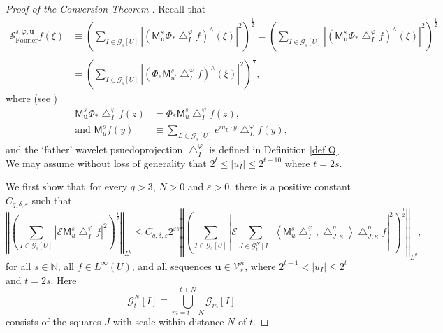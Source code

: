 \documentclass{amsart}%
\theoremstyle{plain}
\numberwithin{equation}{section}
\begin{document}
\begin{proof}
[Proof of the Conversion Theorem ]Recall that%
\begin{align*}
\mathcal{S}_{\operatorname*{Fourier}}^{s,\varphi,\mathbf{u}}f\left(
\xi\right)   & \equiv\left(  \sum_{I\in\mathcal{G}_{s}\left[  U\right]
}\left\vert \left(  \mathsf{M}_{\mathbf{u}}^{s}\Phi_{\ast}\bigtriangleup
_{I}^{\varphi}f\right)  ^{\wedge}\left(  \xi\right)  \right\vert ^{2}\right)
^{\frac{1}{2}}=\left(  \sum_{I\in\mathcal{G}_{s}\left[  U\right]  }\left\vert
\left(  \mathsf{M}_{\mathbf{u}}^{s}\Phi_{\ast}\bigtriangleup_{I}^{\varphi
}f\right)  ^{\wedge}\left(  \xi\right)  \right\vert ^{2}\right)  ^{\frac{1}%
{2}}\\
& =\left(  \sum_{I\in\mathcal{G}_{s}\left[  U\right]  }\left\vert \left(
\Phi_{\ast}\mathsf{M}_{u^{\prime}}^{s}\bigtriangleup_{I}^{\varphi}f\right)
^{\wedge}\left(  \xi\right)  \right\vert ^{2}\right)  ^{\frac{1}{2}},
\end{align*}
where (see \cite[(4.6)]{RiSa2})%
\begin{align}
\mathsf{M}_{\mathbf{u}}^{s}\Phi_{\ast}\bigtriangleup_{I}^{\varphi}f\left(
z\right)   & =\Phi_{\ast}\mathsf{M}_{u}^{s}\bigtriangleup_{I}^{\varphi
}f\left(  z\right)  ,\label{comm}\\
\text{and }\mathsf{M}_{u}^{s}f\left(  y\right)   & \equiv\sum_{L\in
\mathcal{G}_{s}\left[  U\right]  }e^{iu_{L}\cdot y}\bigtriangleup_{L}%
^{\varphi}f\left(  y\right)  ,\nonumber
\end{align}
and the `father' wavelet psuedoprojection $\bigtriangleup_{I}^{\varphi}$ is
defined in Definition \ref{def Q}. We may assume without loss of generality
that $2^{t}\leq\left\vert u_{I}\right\vert \leq2^{t+10}$ where $t=2s$.

We first show that\ for every $q>3$, $N>0$ and $\varepsilon>0$, there is a
positive constant $C_{q,\delta,\varepsilon}$ such that
\begin{equation}
\left\Vert \left(  \sum_{I\in\mathcal{G}_{s}\left[  U\right]  }\left\vert
\mathcal{E}\mathsf{M}_{u}^{s}\bigtriangleup_{I}^{\varphi}f\right\vert
^{2}\right)  ^{\frac{1}{2}}\right\Vert _{L^{q}}\leq C_{q,\delta,\varepsilon
}2^{\varepsilon s}\left\Vert \left(  \sum_{I\in\mathcal{G}_{s}\left[
U\right]  }\left\vert \mathcal{E}\sum_{J\in\mathcal{G}_{t}^{N}\left[
I\right]  }\left\langle \mathsf{M}_{u}^{s}\bigtriangleup_{I}^{\varphi
},\bigtriangleup_{J;\kappa}^{\eta}\right\rangle \bigtriangleup_{J;\kappa
}^{\eta}f\right\vert ^{2}\right)  ^{\frac{1}{2}}\right\Vert _{L^{q}%
},\label{must show again}%
\end{equation}
for all $s\in\mathbb{N}$, all $f\in L^{\infty}\left(  U\right)  $, and all
sequences $\mathbf{u}\in\mathcal{V}_{s}^{n}$, where $2^{t-1}<\left\vert
u_{I}\right\vert \leq2^{t}$ and $t=2s$. Here
\[
\mathcal{G}_{t}^{N}\left[  I\right]  \equiv\bigcup_{m=t-N}^{t+N}%
\mathcal{G}_{m}\left[  I\right]
\]
consists of the squares $J$ with scale within distance $N$ of $t$.


\end{proof}
\end{document}
